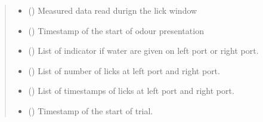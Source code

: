 \documentclass[letterpaper,10pt,english]{sphinxmanual}
\begin{document}
\begin{fulllineitems}
\begin{fulllineitems}
\begin{quote}
\begin{description}
\begin{itemize}
\item {} 
\sphinxAtStartPar
{} () \textendash{} Measured data read durign the lick window

\item {} 
\sphinxAtStartPar
{} () \textendash{} Timestamp of the start of odour presentation

\item {} 
\sphinxAtStartPar
{} () \textendash{} List of indicator if water are given on left port or right port.

\item {} 
\sphinxAtStartPar
{} () \textendash{} List of number of licks at left port and right port.

\item {} 
\sphinxAtStartPar
{} () \textendash{} List of timestamps of licks at left port and right port.

\item {} 
\sphinxAtStartPar
{} () \textendash{} Timestamp of the start of trial.

\end{itemize}


\end{description}\end{quote}

\end{fulllineitems}


\end{fulllineitems}

\end{document}
